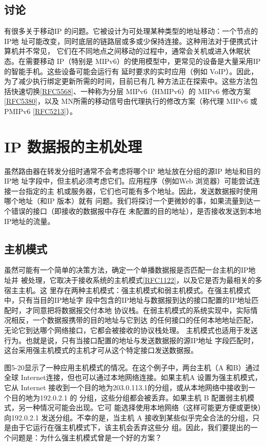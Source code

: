 \subsection{讨论}
有很多关于移动IP 的问题。它被设计为可处理某种类型的地址移动：一个节点的IP地
址可能改变，同时底层的链路层或多或少保持连接。这种用法对于便携式计算机并不常见，
它们在不同地点之间移动的过程中，通常会关机或进入休眠状态。在需要移动 IP（特别是
MIPv6）的使用模型中，更常见的设备是大量采用IP的智能手机。这些设备可能会运行有
延时要求的实时应用（例如 VoIP）。因此，为了减少执行绑定更新所需的时间，目前已有几
种方法正在探索中。这些方法包括快速切换\href{https://www.rfc-editor.org/rfc/rfc5568}{[RFC5568]}、一种称为分层 MIPv6（HMIPv6）的
MIPv6 修改方案\href{https://www.rfc-editor.org/rfc/rfc5380}{[RFC5380]}，以及 MN所需的移动信号由代理执行的修改方案（称代理
MIPv6 或 PMIPv6 \href{https://www.rfc-editor.org/rfc/rfc5213}{[RFC5213]}）。

\section{IP 数据报的主机处理}
虽然路由器在转发分组时通常不会考虑将哪个IP 地址放在分组的源IP 地址和目的IP地
址字段中，但主机必须考虑它们。应用程序（例如Web 浏览器）可能尝试连接一台指定的主
机或服务器，它们也可能有多个地址。因此，发送数据报时使用哪个地址（和IP 版本）就有
问题。我们将探讨一个更微妙的事，如果流量到达一个错误的接口（即接收的数据报中存在
未配置的目的地址），是否接收发送到本地IP地址的流量。

\subsection{主机模式}

虽然可能有一个简单的决策方法，确定一个单播数据报是否匹配一台主机的IP地址并
被处理，它取决于接收系统的主机模式\href{https://www.rfc-editor.org/rfc/rfc1122}{[RFC1122]}，以及它是否为最相关的多宿主主机。这
里存在两种主机模式：强主机模式和弱主机模式。在强主机模式中，只有当目的IP地址字
段中包含的IP地址与数据报到达的接口配置的IP地址匹配时，才同意把将数据报交付本地
协议栈。在弱主机模式的系统实现中，实际情况相反，一个数据报携带的目的地址与它到达
的任何接口的任何本地地址匹配，无论它到达哪个网络接口，它都会被接收的协议栈处理。
主机模式也适用于发送行为。也就是说，只有当接口配置的地址与发送数据报的源IP地址
字段匹配时，这台采用强主机模式的主机才可从这个特定接口发送数据报。

图5-20显示了一种应用主机模式的情况。在这个例子中，两台主机（A 和B）通过全球
Internet连接，但也可以通过本地网络连接。如果主机A 设置为强主机模式，它从 Internet
接收到一个目的地为203.0.113.1的分组，或从本地网络中接收到一个目的地为192.0.2.1 的
分组，这些分组都会被丢弃。如果主机 B 配置弱主机模式，另一种情况可能会出现。它可
能选择使用本地网络（这样可能更方便或更快）向192.0.2.1 发送分组。不幸的是，当主机 A
接收到某些似乎完全合法的分组，只是由于它运行在强主机模式下，该主机会丢弃这些分
组。因此，我们要提出的一个问题是：为什么强主机模式曾是一个好的方案？

